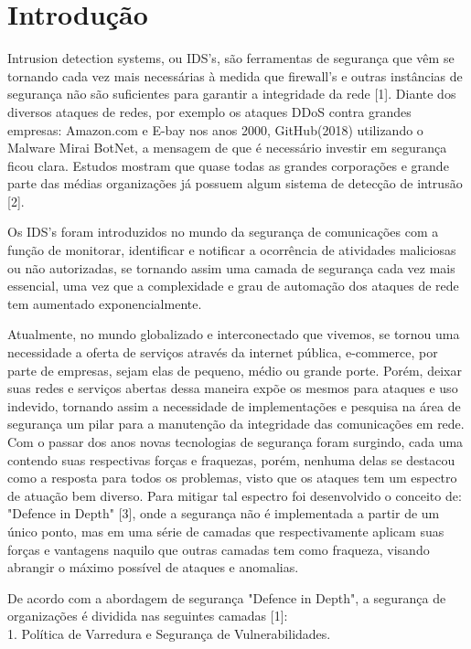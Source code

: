 \documentclass[conference]{IEEEtran}
\begin{document}
\section{Introdução}
	Intrusion detection systems, ou IDS's, são ferramentas de segurança que vêm se tornando cada vez mais necessárias à medida que firewall's e outras instâncias de segurança não são suficientes para garantir a integridade da rede [1]. Diante dos diversos ataques de redes, por exemplo os ataques DDoS contra grandes empresas: Amazon.com e E-bay nos anos 2000, GitHub(2018) utilizando o Malware Mirai BotNet, a mensagem de que é necessário investir em segurança ficou clara. Estudos mostram que quase todas as grandes corporações e grande parte das médias organizações já possuem algum sistema de detecção de intrusão [2].
    
    Os IDS's foram introduzidos no mundo da segurança de comunicações com a função de monitorar, identificar e notificar a ocorrência de atividades maliciosas ou não autorizadas, se tornando assim uma camada de segurança cada vez mais essencial, uma vez que a complexidade e grau de automação dos ataques de rede tem aumentado exponencialmente.
    
    Atualmente, no mundo globalizado e interconectado que vivemos, se tornou uma necessidade a oferta de serviços através da internet pública, e-commerce,  por parte de empresas, sejam elas de pequeno, médio ou grande porte. Porém, deixar suas redes e serviços abertas dessa maneira expõe os mesmos para ataques e uso indevido, tornando assim a necessidade de implementações e pesquisa na área de segurança um pilar para a manutenção da integridade das comunicações em rede. Com o passar dos anos novas tecnologias de segurança foram surgindo, cada uma contendo suas respectivas forças e fraquezas, porém, nenhuma delas se destacou como a resposta para todos os problemas, visto que os ataques tem um espectro de atuação bem diverso. Para mitigar tal espectro foi desenvolvido o conceito de: "Defence in Depth" [3], onde a segurança não é implementada a partir de um único ponto, mas em uma série de camadas que respectivamente aplicam suas forças e vantagens naquilo que outras camadas tem como fraqueza, visando abrangir o máximo possível de ataques e anomalias.
    
    De acordo com a abordagem de segurança "Defence in Depth", a segurança de organizações é dividida nas seguintes camadas [1]:
\\	

    1. Política de Varredura e Segurança de Vulnerabilidades.
    
\end{document}
